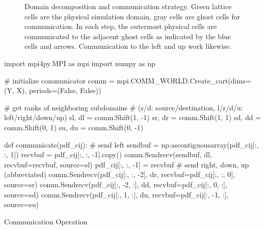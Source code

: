 \begin{figure}[ht!]
    \caption[Domain decomposition and communication strategy]{Domain decomposition and communication strategy. Green lattice cells are the physical simulation domain, gray cells are ghost cells for communication. In each step, the outermost physical cells are communicated to the adjacent ghost cells as indicated by the blue cells and arrows. Communication to the left and up work likewise.}
    \label{fig:domain-decomposition}
\end{figure}

\begin{listing}[ht!]
    \begin{pycode}
        import mpi4py.MPI as mpi
        import numpy as np

        # initialize communicator
        comm = mpi.COMM_WORLD.Create_cart(dims=(Y, X), periods=(False, False))

        # get ranks of neighboring subdomains
        # (s/d: source/destination, l/r/d/u: left/right/down/up)
        sl, dl = comm.Shift(1, -1)
        sr, dr = comm.Shift(1, 1)
        sd, dd = comm.Shift(0, 1)
        su, du = comm.Shift(0, -1)

        def communicate(pdf_cij):
            # send left
            sendbuf = np.ascontiguousarray(pdf_cij[:, :, 1])
            recvbuf = pdf_cij[:, :, -1].copy()
            comm.Sendrecv(sendbuf, dl, recvbuf=recvbuf, source=sl)
            pdf_cij[:, :, -1] = recvbuf
            # send right, down, up (abbreviated)
            comm.Sendrecv(pdf_cij[:, :, -2], dr, recvbuf=pdf_cij[:, :, 0], source=sr)
            comm.Sendrecv(pdf_cij[:, -2, :], dd, recvbuf=pdf_cij[:, 0, :], source=sd)
            comm.Sendrecv(pdf_cij[:, 1, :], du, recvbuf=pdf_cij[:, -1, :], source=su)
    \end{pycode}
    \caption{Communication Operation}
    \label{code:communication}
\end{listing}

